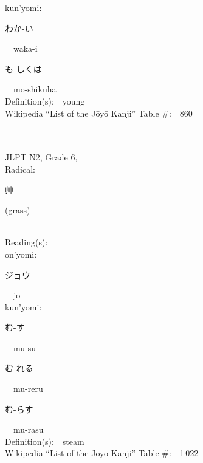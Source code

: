 \begin{multicols}{2}
{\hspace*{1em}}kun'yomi:\ \ \\
{\hspace*{2em}}{\begin{CJK}{UTF8}{min} わか-い \end{CJK}}\ \ waka-i\ \ \\
{\hspace*{2em}}{\begin{CJK}{UTF8}{min} も-しくは \end{CJK}}\ \ mo-shikuha\ \ \\
Definition(s):\ \ young \\
Wikipedia ``List of the J\=oy\=o Kanji'' Table \#:\ \ 860 \\
\ \ \\
{\fontsize{34pt}{40pt}  }\ \ \\  %
{JLPT N2, Grade 6, \\Radical:\ \ {\begin{CJK}{UTF8}{min} 艸 \end{CJK}} (grass) } \\
Reading(s):\ \ \\
{\hspace*{1em}}on'yomi:\ \ \\
{\hspace*{2em}}{\begin{CJK}{UTF8}{min} ジョウ \end{CJK}}\ \ j\=o\ \ \\
{\hspace*{1em}}kun'yomi:\ \ \\
{\hspace*{2em}}{\begin{CJK}{UTF8}{min} む-す \end{CJK}}\ \ mu-su\ \ \\
{\hspace*{2em}}{\begin{CJK}{UTF8}{min} む-れる \end{CJK}}\ \ mu-reru\ \ \\
{\hspace*{2em}}{\begin{CJK}{UTF8}{min} む-らす \end{CJK}}\ \ mu-rasu\ \ \\
Definition(s):\ \ steam \\
Wikipedia ``List of the J\=oy\=o Kanji'' Table \#:\ \ 1\,022 \\

\end{multicols}
